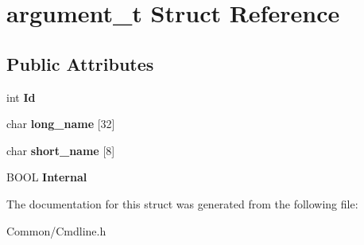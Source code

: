 \hypertarget{structargument__t}{}\section{argument\+\_\+t Struct Reference}
\label{structargument__t}
\subsection*{Public Attributes}
\begin{DoxyCompactItemize}
\item 
\mbox{\label{structargument__t_a42e2018c1b7c4b5e0f3165b5e9d0e85f}} 
int {\bfseries Id}
\item 
\mbox{\label{structargument__t_af61ec103b6b770eea969d07d8cc5981e}} 
char {\bfseries long\+\_\+name} \mbox{[}32\mbox{]}
\item 
\mbox{\label{structargument__t_aebf9bdff3c38cf422a4adf9de508bd21}} 
char {\bfseries short\+\_\+name} \mbox{[}8\mbox{]}
\item 
\mbox{\label{structargument__t_a3e486d15ef4fdad5345bdab1d77a422e}} 
B\+O\+OL {\bfseries Internal}
\end{DoxyCompactItemize}


The documentation for this struct was generated from the following file\+:\begin{DoxyCompactItemize}
\item 
Common/Cmdline.\+h\end{DoxyCompactItemize}
